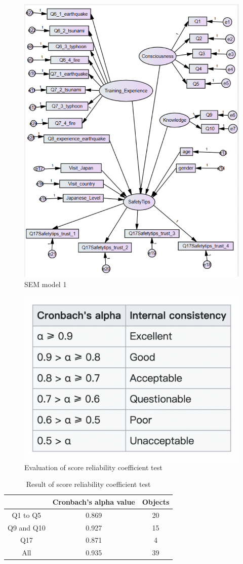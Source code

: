 \begin{figure}[h]
  \includegraphics[width=0.5\linewidth]{Figure/Figure23.jpg}
  \centering
  \caption{SEM model 1}
  \label{fig23}
\end{figure}

\begin{figure}[h]
  \includegraphics[width=0.5\linewidth]{Figure/Figure24.jpg}
  \centering
  \caption{Evaluation of score reliability coefficient test}
  \label{fig24}
\end{figure}


\begin{table}[h]
  \caption{Result of score reliability coefficient test}
  \label{table8}
  \centering
  \begin{tabular}{|c|c|c|}
  \hline
          & Cronbach's alpha value & Objects \\
 \hline 
  Q1 to Q5 & 0.869 & 20 \\
 \hline
  Q9 and Q10 & 0.927 & 15 \\
 \hline 
  Q17 & 0.871 & 4 \\
 \hline
  All & 0.935 & 39 \\
 \hline
  \end{tabular}
\end{table}

